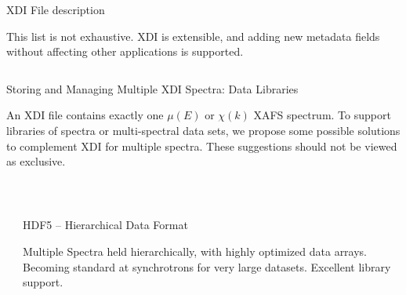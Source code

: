 \documentclass[final]{beamer}
\begin{document}
\begin{frame}{}
\begin{columns}[t]
\begin{column}{.44\linewidth}
\begin{block}{\large XDI File description}
         \hspace{3mm}

         This list is not exhaustive.  XDI is extensible, and adding new
         metadata fields without affecting other applications is supported.


       \end{block}
     \end{column}

   \end{columns}

   
   \begin{block}{\large Storing and Managing Multiple XDI Spectra:  Data Libraries}
     
     An XDI file contains exactly one $\mu(E)$ or $\chi(k)$ XAFS
     spectrum.  To support libraries of spectra or multi-spectral data
     sets, we propose some possible solutions to complement XDI for multiple spectra.
     These suggestions should not be viewed as exclusive.
         
     \vspace{-3mm}
     
   \end{block}
   

   {\ }   \vspace{-20mm}


% 

    \begin{columns}[t]
      \begin{column}{.01\linewidth}\end{column}
      \begin{column}{.31\linewidth}
        \begin{block}{HDF5 -- Hierarchical Data Format}

          \justifying Multiple Spectra held hierarchically, with highly
          optimized data arrays.  Becoming standard at synchrotrons for
          very large datasets.  Excellent library support.


\end{block}
\end{column}
\end{columns}
\end{frame}
\end{document}
